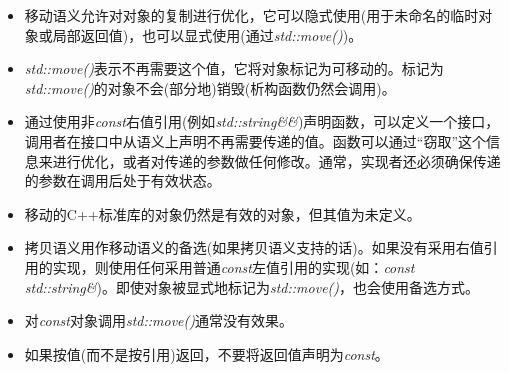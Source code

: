 \begin{itemize}
	\item 移动语义允许对对象的复制进行优化，它可以隐式使用(用于未命名的临时对象或局部返回值)，也可以显式使用(通过\textit{std::move()})。
	\item \textit{std::move()}表示不再需要这个值，它将对象标记为可移动的。标记为\textit{std::move()}的对象不会(部分地)销毁(析构函数仍然会调用)。
	\item 通过使用非\textit{const}右值引用(例如\textit{std::string\&\&})声明函数，可以定义一个接口，调用者在接口中从语义上声明不再需要传递的值。函数可以通过“窃取”这个信息来进行优化，或者对传递的参数做任何修改。通常，实现者还必须确保传递的参数在调用后处于有效状态。
	\item 移动的C++标准库的对象仍然是有效的对象，但其值为未定义。
	\item 拷贝语义用作移动语义的备选(如果拷贝语义支持的话)。如果没有采用右值引用的实现，则使用任何采用普通\textit{const}左值引用的实现(如：\textit{const std::string\&})。即使对象被显式地标记为\textit{std::move()}，也会使用备选方式。
	\item 对\textit{const}对象调用\textit{std::move()}通常没有效果。
	\item 如果按值(而不是按引用)返回，不要将返回值声明为\textit{const}。
\end{itemize}

